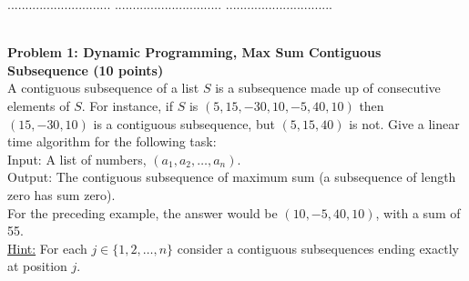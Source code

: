 \documentclass{article}
\begin{document}
\title{
}



\date{}


\newcommand{\DEF}[1]{{\em #1\/}}

\newcommand\chic{\chi_c}
\newcommand\C{\hbox{${\cal C}$}}
\newcommand{\RR}{\mbox{$\mathbb R$}}
\newcommand{\NN}{\mbox{$\mathbb N$}}
\newcommand{\ZZ}{\mbox{$\mathbb Z$}}
\newcommand{\eopf}{\raisebox{0.8ex}{\framebox{}}}
\newcommand{\dist}{\hbox{\rm d}}
\renewcommand\a{\alpha}
\renewcommand\b{\beta}
\renewcommand\c{\gamma}
\renewcommand\d{\delta}
\newcommand\D{\Delta}
\newcommand{\directedchi}{\mbox{$\vec{\chi}$}}
\newcommand{\directedE}{\mbox{$\vec{E}$}}
\newcommand{\directedG}{\mbox{$\vec{G}$}}
\newcommand{\directedK}{\mbox{$\vec{K}$}}

\newenvironment{proof}%
{\noindent{\bf Proof.}\ }%
{\hfill\eopf\par\bigskip}%




 $.............................$
 $..............................$
          $..............................$

\noindent
{}\\

\noindent
{\bf Problem 1: Dynamic Programming,  Max Sum Contiguous Subsequence (10 points)}\\
A contiguous subsequence of a list $S$ is a subsequence made up of consecutive elements of $S$. For
instance, if $ S$ is $(5, 15, -30, 10, -5, 40, 10)$ then $(15, -30, 10)$ is a contiguous subsequence, 
but $(5,15,40)$ is not. Give a linear time algorithm for the following task:\\
Input: A list of numbers, $(a_1 , a_2 , \ldots , a_n)$.\\
Output: The contiguous subsequence of maximum sum (a subsequence of length zero
has sum zero).\\
For the preceding example, the answer would be $(10,-5,40,10)$, with a sum of 55.\\
\underline{Hint:} For each $j \in \{1 , 2, \ldots , n \}$ consider a contiguous subsequences ending exactly at position $j$.\\
\end{document}
